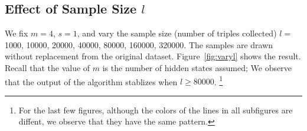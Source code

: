 \documentclass{article}
\def\E{\mathbb{E}}
\def\bin{\text{bin}}
\begin{document}





\subsection{Effect of Sample Size $l$}
We fix $m = 4$, $s = 1$, and vary the sample size (number of triples collected) $l =$ 1000, 10000, 20000, 40000, 80000, 160000, 320000. The samples are drawn without replacement from the original dataset. Figure~\ref{fig:varyl} shows the result. Recall that the value of $m$ is the number of hidden states assumed; We observe that the output of the algorithm stablizes when $l \geq 80000$. \footnote{For the last few figures, although the colors of the lines in all subfigures are diffent, we observe that they have the same pattern.}
\end{document}

